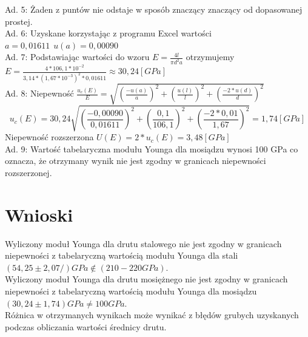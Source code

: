 \documentclass[a4paper,10pt,twoside]{article}
\begin{document}
\begin{figure}[h]
\end{figure}
\noindent
Ad. 5: Żaden z puntów nie odstaje w sposób znaczący znaczący od dopasowanej prostej.\\
Ad. 6: Uzyskane korzystając z programu Excel wartości $a = 0,01611 \hspace{5pt}u(a) = 0,00090$\\
Ad. 7: Podstawiając wartości do wzoru $E = \frac{4l}{\pi d^2 a}$ otrzymujemy $E = \frac{4*106,1*10^{-2}}{3,14 * (1,67*10^{-3})^2 * 0,01611} \approx 30,24[GPa]$\\
Ad. 8: Niepewność $\frac{u_c(E)}{E} = \sqrt{\left (\frac{-u(a)}{a} \right )^2 + \left (\frac{u(l)}{l} \right )^2 + \left (\frac{-2*u(d)}{d} \right )^2}$ $$u_c(E) = 30,24\sqrt{\left (\frac{-0,00090}{0,01611} \right )^2 + \left (\frac{0,1}{106,1} \right )^2 + \left (\frac{-2*0,01}{1,67} \right )^2} = 1,74[GPa]$$ Niepewność rozszerzona $U(E) = 2*u_c(E) = 3,48[GPa]$\\
Ad. 9: Wartość tabelaryczna modułu Younga dla mosiądzu wynosi 100 GPa co oznacza, że otrzymany wynik nie jest zgodny w granicach niepewności rozszerzonej.

	\section{Wnioski}
Wyliczony moduł Younga dla drutu stalowego nie jest zgodny w granicach niepewności z tabelaryczną wartością modułu Younga dla stali $(54,25\pm 2,07/) GPa \not \in (210-220 GPa)$.\\ 
Wyliczony moduł Younga dla drutu mosiężnego nie jest zgodny w granicach niepewności z tabelaryczną wartością modułu Younga dla mosiądzu $(30,24 \pm 1,74) GPa \not = 100 GPa$.\\
Różnica w otrzymanych wynikach może wynikać z błędów grubych uzyskanych podczas obliczania wartości średnicy drutu.
\end{document}
